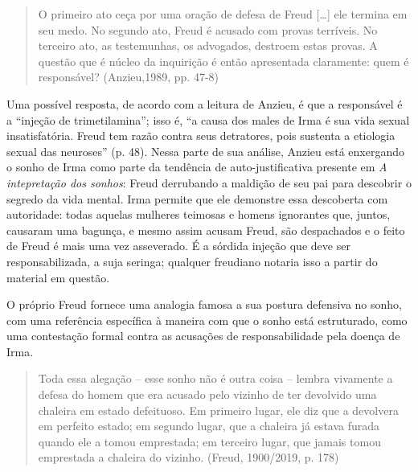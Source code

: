\begin{quote}
O primeiro ato ceça por uma oração de defesa de Freud {[}\ldots{}{]} ele
termina em seu medo. No segundo ato, Freud é acusado com provas
terríveis. No terceiro ato, as testemunhas, os advogados, destroem estas
provas. A questão que é núcleo da inquirição é então apresentada
claramente: quem é responsável? (Anzieu,1989, pp. 47-8)
\end{quote}

Uma possível resposta, de acordo com a leitura de Anzieu, é que a
responsável é a ``injeção de trimetilamina''; isso é, ``a causa dos
males de Irma é sua vida sexual insatisfatória. Freud tem razão contra
seus detratores, pois sustenta a etiologia sexual das neuroses'' (p.
48). Nessa parte de sua análise, Anzieu está enxergando o sonho de Irma
como parte da tendência de auto-justificativa presente em \emph{A
intepretação dos sonhos}: Freud derrubando a maldição de seu pai para
descobrir o segredo da vida mental. Irma permite que ele demonstre essa
descoberta com autoridade: todas aquelas mulheres teimosas e homens
ignorantes que, juntos, causaram uma bagunça, e mesmo assim acusam
Freud, são despachados e o feito de Freud é mais uma vez asseverado. É a
sórdida injeção que deve ser responsabilizada, a suja seringa; qualquer
freudiano notaria isso a partir do material em questão.

O próprio Freud fornece uma analogia famosa a sua postura defensiva no
sonho, com uma referência específica à maneira com que o sonho está
estruturado, como uma contestação formal contra as acusações de
responsabilidade pela doença de Irma.

\begin{quote}
Toda essa alegação -- esse sonho não é outra coisa -- lembra vivamente a
defesa do homem que era acusado pelo vizinho de ter devolvido uma
chaleira em estado defeituoso. Em primeiro lugar, ele diz que a
devolvera em perfeito estado; em segundo lugar, que a chaleira já estava
furada quando ele a tomou emprestada; em terceiro lugar, que jamais
tomou emprestada a chaleira do vizinho. (Freud, 1900/2019, p. 178)
\end{quote}

